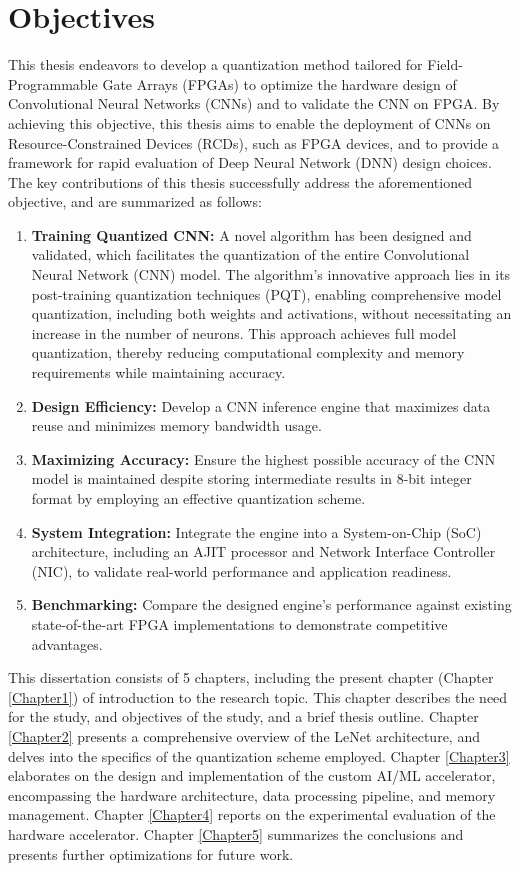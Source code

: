 \section{Objectives}
This thesis endeavors to develop a quantization method tailored for Field-Programmable Gate Arrays (FPGAs) to optimize the hardware design of Convolutional Neural Networks (CNNs) and to validate the CNN on FPGA. By achieving this objective, this thesis aims to enable the deployment of CNNs on Resource-Constrained Devices (RCDs), such as FPGA devices, and to provide a framework for rapid evaluation of Deep Neural Network (DNN) design choices. The key contributions of this thesis successfully address the aforementioned objective, and are summarized as follows:
\begin{enumerate}
  \item \textbf{Training Quantized CNN:} A novel algorithm has been designed and validated, which facilitates the quantization of the entire Convolutional Neural Network (CNN) model. The algorithm's innovative approach lies in its  post-training quantization techniques (PQT), enabling comprehensive model quantization, including both weights and activations, without necessitating an increase in the number of neurons. This  approach achieves full model quantization, thereby reducing computational complexity and memory requirements while maintaining accuracy.
  \item \textbf{Design Efficiency:} Develop a CNN inference engine that maximizes data reuse and minimizes memory bandwidth usage.
  \item \textbf{Maximizing Accuracy:} Ensure the highest possible accuracy of the CNN model is maintained despite storing intermediate results in 8-bit integer format by employing an effective quantization scheme.
  \item \textbf{System Integration:} Integrate the engine into a System-on-Chip (SoC) architecture, including an AJIT processor and Network Interface Controller (NIC), to validate real-world performance and application readiness.

  \item \textbf{Benchmarking:} Compare the designed engine’s performance against existing state-of-the-art FPGA implementations to demonstrate competitive advantages.
\end{enumerate}
This dissertation consists of 5 chapters, including the present chapter (Chapter \ref{Chapter1}) of introduction to the research topic. This chapter describes the need for the study,
 and objectives of the study, and a brief thesis outline. Chapter \ref{Chapter2} presents a comprehensive overview of the LeNet architecture, and delves into the specifics of the quantization scheme employed. Chapter \ref{Chapter3} elaborates on the design and implementation of the custom AI/ML accelerator, encompassing the hardware architecture, data processing pipeline, and memory management. Chapter \ref{Chapter4} reports on the experimental evaluation of the hardware accelerator.  Chapter \ref{Chapter5} summarizes the conclusions  and presents further optimizations for future work.
